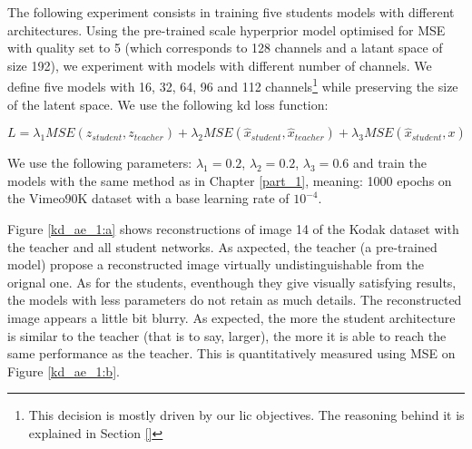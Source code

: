 The following experiment consists in training five students models with different architectures. Using the pre-trained scale hyperprior model optimised for MSE with \textsf{quality} set to 5 (which corresponds to 128 channels and a latant space of size 192), we experiment with models with different number of channels. We define five models with 16, 32, 64, 96 and 112 channels\footnote{This decision is mostly driven by our \acrshort{lic} objectives. The reasoning behind it is explained in Section \ref{}} while preserving the size of the latent space. We use the following \acrshort{kd} loss function:

\begin{equation}
    L = \lambda_{1} MSE(z_{student}, z_{teacher}) + \lambda_{2} MSE(\hat{x}_{student}, \hat{x}_{teacher}) + \lambda_{3} MSE(\hat{x}_{student}, x)
    \label{loss_1}
\end{equation}

We use the following parameters: \(\lambda_{1} = 0.2\), \(\lambda_{2} = 0.2\), \(\lambda_{3} = 0.6\) and train the models with the same method as in Chapter \ref{part_1}, meaning: 1000 epochs on the Vimeo90K dataset with a base learning rate of \(10^{-4}\).

Figure \ref{kd_ae_1:a} shows reconstructions of image 14 of the Kodak dataset with the teacher and all student networks. As axpected, the teacher (a pre-trained model) propose a reconstructed image virtually undistinguishable from the orignal one. As for the students, eventhough they give visually satisfying results, the models with less parameters do not retain as much details. The reconstructed image appears a little bit blurry. As expected, the more the student architecture is similar to the teacher (that is to say, larger), the more it is able to reach the same performance as the teacher. This is quantitatively measured using MSE on Figure \ref{kd_ae_1:b}.

